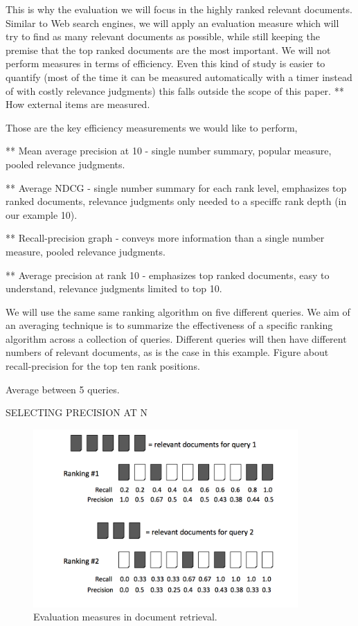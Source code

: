 \documentclass{llncs}
\begin{document}
This is why  the evaluation we will focus in the highly ranked relevant documents. Similar to Web search engines, we will apply an evaluation measure which will try to find as many relevant documents as possible, while still keeping the  premise that the top ranked documents are the most important. We will not perform measures in terms of efficiency. Even this kind of study is easier to quantify (most of the time it can be measured automatically with a timer instead of with costly relevance judgments) this falls outside the scope of this paper.
** How external items are measured.

Those are the key efficiency measurements we would like to perform,

** Mean average precision at 10  - single number summary, popular measure, pooled
relevance judgments.

** Average NDCG - single number summary for each rank level, emphasizes top ranked documents, relevance judgments only needed to a speciffc rank depth
(in our example 10).

** Recall-precision graph - conveys more information than a single number measure, pooled relevance judgments.

** Average precision at rank 10 - emphasizes top ranked documents, easy to understand, relevance judgments limited to top 10.

We will use the same same ranking algorithm on five different queries. We aim of an averaging technique is to summarize the effectiveness of a specific ranking algorithm across a collection of queries. Different queries will then have different numbers of relevant documents, as is the case in this example. Figure about recall-precision for the top ten rank positions.

Average between 5 queries.

SELECTING PRECISION AT N


\begin{figure}[h!]
\centering
\includegraphics[width=0.9\textwidth]{figure/cumulativeGain}
\caption{Evaluation measures in document retrieval.}
\label{fig:namedCumulativeGain}%
\end{figure}
\end{document}
